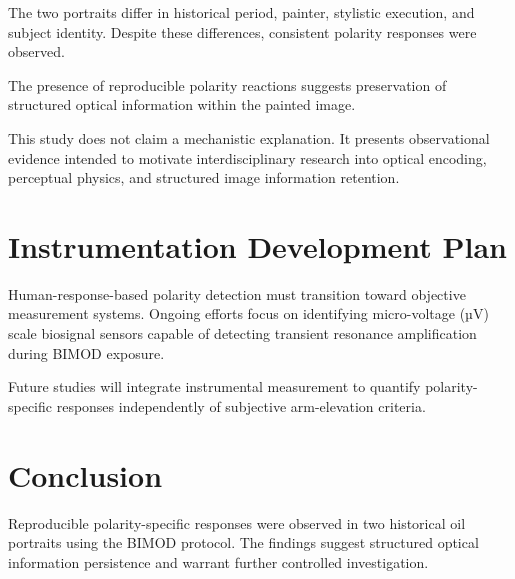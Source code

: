 \documentclass[12pt]{article}
\begin{document}
The two portraits differ in historical period, painter, stylistic execution, and subject identity. Despite these differences, consistent polarity responses were observed.

The presence of reproducible polarity reactions suggests preservation of structured optical information within the painted image.

This study does not claim a mechanistic explanation. It presents observational evidence intended to motivate interdisciplinary research into optical encoding, perceptual physics, and structured image information retention.

\section{Instrumentation Development Plan}

Human-response-based polarity detection must transition toward objective measurement systems. Ongoing efforts focus on identifying micro-voltage (µV) scale biosignal sensors capable of detecting transient resonance amplification during BIMOD exposure.

Future studies will integrate instrumental measurement to quantify polarity-specific responses independently of subjective arm-elevation criteria.

\section{Conclusion}

Reproducible polarity-specific responses were observed in two historical oil portraits using the BIMOD protocol. The findings suggest structured optical information persistence and warrant further controlled investigation.



\end{document}
